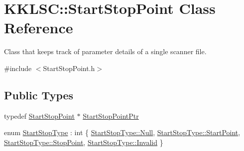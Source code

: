 \hypertarget{class_k_k_l_s_c_1_1_start_stop_point}{}\section{K\+K\+L\+SC\+:\+:Start\+Stop\+Point Class Reference}
\label{class_k_k_l_s_c_1_1_start_stop_point}


Class that keeps track of parameter details of a single scanner file.  




{\ttfamily \#include $<$Start\+Stop\+Point.\+h$>$}

\subsection*{Public Types}
\begin{DoxyCompactItemize}
\item 
typedef \hyperlink{class_k_k_l_s_c_1_1_start_stop_point}{Start\+Stop\+Point} $\ast$ \hyperlink{class_k_k_l_s_c_1_1_start_stop_point_afcbbf85be8f397421049c64a12dec7a3}{Start\+Stop\+Point\+Ptr}
\item 
enum \hyperlink{class_k_k_l_s_c_1_1_start_stop_point_aca5818602fc58bfe4c9794b311288680}{Start\+Stop\+Type} \+: int \{ \hyperlink{class_k_k_l_s_c_1_1_start_stop_point_aca5818602fc58bfe4c9794b311288680abbb93ef26e3c101ff11cdd21cab08a94}{Start\+Stop\+Type\+::\+Null}, 
\hyperlink{class_k_k_l_s_c_1_1_start_stop_point_aca5818602fc58bfe4c9794b311288680a66ebb760a5bef13b69ceac0feb004d2a}{Start\+Stop\+Type\+::\+Start\+Point}, 
\hyperlink{class_k_k_l_s_c_1_1_start_stop_point_aca5818602fc58bfe4c9794b311288680a4fa60ea4d5684f76f0f766d39f06de4f}{Start\+Stop\+Type\+::\+Stop\+Point}, 
\hyperlink{class_k_k_l_s_c_1_1_start_stop_point_aca5818602fc58bfe4c9794b311288680a4bbb8f967da6d1a610596d7257179c2b}{Start\+Stop\+Type\+::\+Invalid}
 \}
\end{DoxyCompactItemize}
